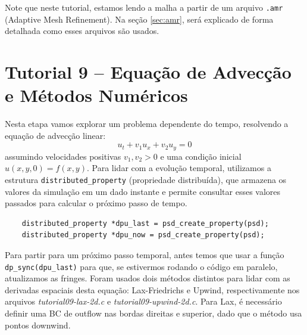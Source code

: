 Note que neste tutorial, estamos lendo a malha a partir de um arquivo \texttt{.amr} (Adaptive Mesh Refinement). Na seção \ref{sec:amr}, será explicado de forma detalhada como esses arquivos são usados.

\section{Tutorial 9 -- Equação de Advecção e Métodos Numéricos}
\label{sec:tut9}

Nesta etapa vamos explorar um problema dependente do tempo, resolvendo a equação de advecção linear:
$$ u_t + v_1u_x + v_2u_y = 0 $$
assumindo velocidades positivas $v_1, v_2 > 0$ e uma condição inicial $u(x,y,0) = f(x,y)$. Para lidar com a evolução temporal, utilizamos a estrutura \texttt{distributed\_property} (propriedade distribuída), que armazena os valores da simulação em um dado instante e permite consultar esses valores passados para calcular o próximo passo de tempo.
\begin{verbatim}
    distributed_property *dpu_last = psd_create_property(psd);
    distributed_property *dpu_now = psd_create_property(psd);
\end{verbatim}

Para partir para um próximo passo temporal, antes temos que usar a função \texttt{dp\_sync(dpu\_last)} para que, se estivermos rodando o código em paralelo, atualizamos as fringes.
Foram usados dois métodos distintos para lidar com as derivadas espaciais desta equação: Lax-Friedrichs e Upwind, respectivamente nos arquivos \textit{tutorial09-lax-2d.c} e \textit{tutorial09-upwind-2d.c}. Para Lax, é necessário definir uma BC de outflow nas bordas direitas e superior, dado que o método usa pontos downwind.

